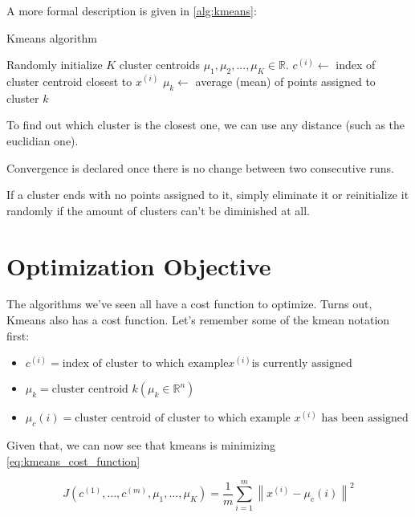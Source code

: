 \documentclass[10pt]{extarticle}
\newcommand{\norm}[1]{\left\lVert#1\right\rVert}
\begin{document}
A more formal description is given in \cref{alg:kmeans}:

\begin{algorithm}
\caption{Kmeans algorithm}\label{alg:kmeans}
\begin{algorithmic}[1]
 
    \State Randomly initialize $K$ cluster centroids $\mu_1, \mu_2, ... , \mu_K \in \mathbb{R}$.
         
            \State $c^{(i)} \gets$ index of cluster centroid closest to $x^{(i)}$
        \EndFor 
            \State $\mu_k \gets$ average (mean) of points assigned to cluster $k$
        \EndFor
    \EndWhile
\EndFunction
\end{algorithmic}
\end{algorithm}

To find out which cluster is the closest one, we can use any distance
(such as the euclidian one).

Convergence is declared once there is no change between two consecutive
runs.

If a cluster ends with no points assigned to it, simply eliminate it or
reinitialize it randomly if the amount of clusters can't be diminished
at all.

\section{Optimization Objective}\label{optimization-objective}

The algorithms we've seen all have a cost function to optimize. Turns
out, Kmeans also has a cost function. Let's remember some of the kmean
notation first:

\begin{itemize}
\itemsep1pt\parskip0pt
\item
  $c^{(i)} = \text{index of cluster to which example} x^{(i)} \text{is currently assigned}$
\item
  $\mu_k = \text{cluster centroid } k (\mu_k \in \mathbb{R}^n)$
\item
  $\mu_c(i) = \text{cluster centroid of cluster to which example } x^{(i)} \text{ has been assigned}$
\end{itemize}

Given that, we can now see that kmeans is minimizing
\cref{eq:kmeans_cost_function}

\begin{equation} \label{eq:kmeans_cost_function}
J(c^{(1)}, \dots, c^{(m)}, \mu_1, \dots, \mu_K) = \frac{1}{m} \sum_{i=1}^{m} \norm{x^{(i)} - \mu_c(i)}^2
\end{equation}
\end{document}
